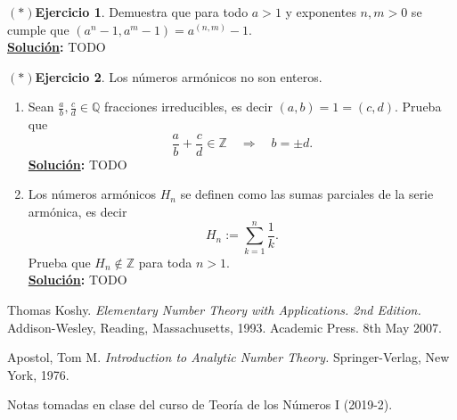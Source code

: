 \documentclass[11pt,letterpaper]{article}
\theoremstyle{definition}\newtheorem{p}{Ejercicio}
\theoremstyle{definition}\newtheorem{pp}[p]{$(*)$Ejercicio}
\numberwithin{p}{section}
\newcommand{\Z}{\mathbb{Z}}
\newcommand{\Q}{\mathbb{Q}}
\newcommand{\ent}{\Longrightarrow}
\newcommand{\sol}{\textbf{\underline{Solución}: }} %
\begin{document}
%
\begin{pp}
  Demuestra que para todo $a>1$ y exponentes $n,m>0$ se cumple que $(a^n-1,a^m-1)=a^{(n,m)}-1$.\\
  \sol TODO
  
\end{pp}
%
\begin{pp}
  Los n\'umeros arm\'onicos no son enteros. 
  \begin{enumerate}
  \item Sean $\frac{a}{b},\frac{c}{d}\in\Q$ fracciones irreducibles, es decir $(a,b)=1=(c,d)$. Prueba que
    \[
      \frac{a}{b}+\frac{c}{d}\in\Z \quad\ent\quad b=\pm d.
    \]
    \sol TODO
  \item Los n\'umeros arm\'onicos $H_n$ se definen como las sumas parciales de la serie arm\'onica, es decir
  \[
    H_n:=\sum_{k=1}^n\frac{1}{k}.
  \]
  Prueba que $H_n\not\in\Z$ para toda $n>1$.\\
  \sol TODO
  \end{enumerate}
\end{pp}




\begin{thebibliography}{}

\bibitem{} 
Thomas Koshy. 
\textit{Elementary Number Theory with Applications. 2nd Edition.}
Addison-Wesley, Reading, Massachusetts, 1993.
Academic Press. 
8th May 2007.

\bibitem{}
Apostol, Tom M. 
\textit{Introduction to Analytic Number Theory.} 
Springer-Verlag, New York, 1976.

\bibitem{}
Notas tomadas en clase del curso de Teoría de los Números I (2019-2).

\end{thebibliography}
\end{document}

